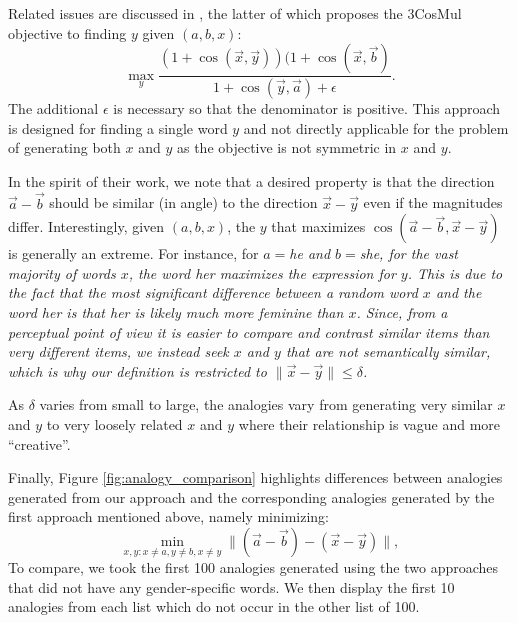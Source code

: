 \documentclass{article}
\begin{document}
Related issues are discussed in \cite{turney2012domain, levyGoldberg14}, the latter of which proposes the 3CosMul objective to finding $y$ given $(a,b,x)$:
$$\max_y \frac{(1+\cos(\vec{x},\vec{y}))(1+\cos(\vec{x},\vec{b})}{1+\cos(\vec{y}, \vec{a})+\epsilon}.$$
The additional $\epsilon$ is necessary so that the denominator is positive. This approach is designed for finding a single word $y$ and not directly applicable for the problem of generating both $x$ and $y$ as the objective is not symmetric in $x$ and $y$.

In the spirit of their work, we note that a desired property is that the direction $\vec{a}-\vec{b}$ should be similar (in angle) to the direction $\vec{x}-\vec{y}$ even if the magnitudes differ. Interestingly, given $(a,b,x)$, the $y$ that maximizes $\cos(\vec{a}-\vec{b},\vec{x}-\vec{y})$ is generally an extreme. For instance, for $a=$\em{he} and $b=$\em{she}, for the vast majority of words $x$, the word {\em her} maximizes the expression for $y$. This is due to the fact that the most significant difference between a random word $x$ and the word {\em her} is that {\em her} is likely much more feminine than $x$. Since, from a perceptual point of view it is easier to compare and contrast similar items than very different items, we instead seek $x$ and $y$ that are not semantically similar, which is why our definition is restricted to $\|\vec{x}-\vec{y}\|\leq \delta$.  

As $\delta$ varies from small to large, the analogies vary from generating very similar $x$ and $y$ to very loosely related $x$ and $y$ where their relationship is vague and more ``creative''.

Finally, Figure \ref{fig:analogy_comparison} highlights differences between analogies generated from our approach and the corresponding analogies generated by the first approach mentioned above, namely minimizing:
\begin{equation}\label{eq:cosadd}
\min_{x,y:x\neq a, y\neq b, x\neq y}\|(\vec{a}-\vec{b})-(\vec{x}-\vec{y})\|,
\end{equation}
To compare, we took the first 100 analogies generated using the two approaches that did not have any gender-specific words. We then display the first 10 analogies from each list which do not occur in the other list of 100.
\end{document}
